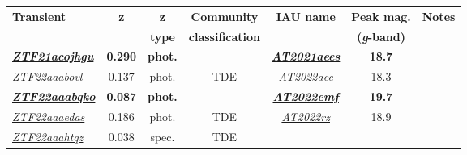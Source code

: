 \begin{table*}[t!]
  \begin{tabular}{l  c  c  c  c  c  c}
    \hline
    \textbf{Transient}                                                                                & \textbf{z}     & \textbf{z}     & \textbf{Community}      & \textbf{IAU name} & \textbf{Peak mag.}         & \textbf{Notes} \\
                                                                                                      &                & \textbf{type}  & \textbf{classification} &                   & \textbf{(\textit{g}-band)} &                \\
    \hline
    \hline
    \textbf{\textit{\href{https://ztfnuclear.simeonreusch.com/transient/ZTF21acojhgu}{ZTF21acojhgu}}} & \textbf{0.290} & \textbf{phot.} & ~                       &
    \textbf{\textit{\href{https://www.wis-tns.org/object/2021aees}{AT2021aees}}}                      & \textbf{18.7}  &                                                                                                            \\
    \textit{\href{https://ztfnuclear.simeonreusch.com/transient/ZTF22aaabovl}{ZTF22aaabovl}}          & 0.137          & phot.          & TDE                     &
    \textit{\href{https://www.wis-tns.org/object/2022aee}{AT2022aee}}                                 & 18.3           &                                                                                                            \\
    \textbf{\textit{\href{https://ztfnuclear.simeonreusch.com/transient/ZTF22aaabqko}{ZTF22aaabqko}}} & \textbf{0.087} & \textbf{phot.} & ~                       &
    \textbf{\textit{\href{https://www.wis-tns.org/object/2022emf}{AT2022emf}}}                        & \textbf{19.7}  &                                                                                                            \\
    \textit{\href{https://ztfnuclear.simeonreusch.com/transient/ZTF22aaaedas}{ZTF22aaaedas}}          & 0.186          & phot.          & TDE                     &
    \textit{\href{https://www.wis-tns.org/object/2022rz}{AT2022rz}}                                   & 18.9           &                                                                                                            \\
    \textit{\href{https://ztfnuclear.simeonreusch.com/transient/ZTF22aaahtqz}{ZTF22aaahtqz}}          & 0.038          & spec.          & TDE                     &

\end{tabular}
\end{table*}
